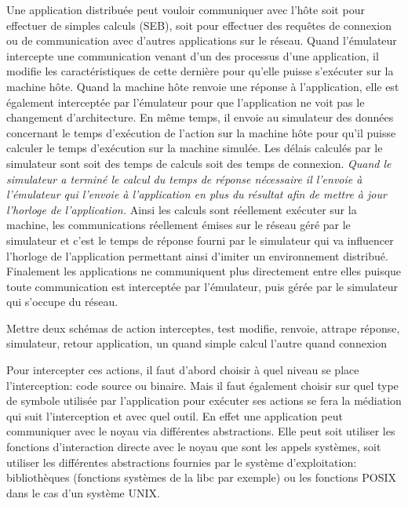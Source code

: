  Une application distribuée peut vouloir communiquer avec l'hôte soit pour
 effectuer de simples calculs (SEB), soit pour effectuer des requêtes de
 connexion ou de communication avec d'autres applications sur le réseau. Quand
 l'émulateur intercepte une communication venant d'un des processus d'une
 application, il modifie les caractéristiques de cette dernière pour qu'elle
 puisse s'exécuter sur la machine hôte. Quand la machine hôte renvoie une
 réponse à l'application, elle est également interceptée par l'émulateur pour
 que l'application ne voit pas le changement d'architecture. En même temps, il
 envoie au simulateur des données concernant le temps d'exécution de l'action
 sur la machine hôte pour qu'il puisse calculer le temps d'exécution sur la
 machine simulée. Les délais calculés par le simulateur sont soit des temps de
 calculs soit des temps de connexion. \textit{Quand le simulateur a terminé le
   calcul du temps de réponse nécessaire il l'envoie à l'émulateur qui l'envoie
   à l'application en plus du résultat afin de mettre à jour l'horloge de
   l'application.} Ainsi les calculs sont réellement exécuter sur la machine,
 les communications réellement émises sur le réseau géré par le simulateur et
 c'est le temps de réponse fourni par le simulateur qui va influencer l'horloge
 de l'application permettant ainsi d'imiter un environnement
 distribué. Finalement les applications ne communiquent plus directement entre
 elles puisque toute communication est interceptée par l'émulateur, puis gérée
 par le simulateur qui s'occupe du réseau.

{\color{red} Mettre deux schémas de action interceptes, test modifie, renvoie,
  attrape réponse, simulateur, retour application, un quand simple calcul
  l'autre quand connexion}

Pour intercepter ces actions, il faut d'abord choisir à quel niveau se place
l'interception: code source ou binaire. Mais il faut également choisir sur quel
type de symbole utilisée par l'application pour exécuter ses actions se fera la
médiation qui suit l'interception et avec quel outil. En effet une application
peut communiquer avec le noyau via différentes abstractions. Elle peut soit
utiliser les fonctions d'interaction directe avec le noyau que sont les appels
systèmes, soit utiliser les différentes abstractions fournies par le système
d'exploitation: bibliothèques (fonctions systèmes de la libc par exemple) ou les
fonctions POSIX dans le cas d'un système UNIX.

